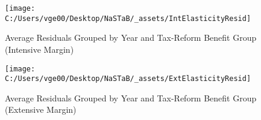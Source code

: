 \documentclass[ review  , 3p ]{elsarticle}
\begin{document}
  \begin{figure}
  
  {\centering \texttt{[image: C:/Users/vge00/Desktop/NaSTaB/\_assets/IntElasticityResid]} 
  
  }
  
  \caption{Average Residuals Grouped by Year and Tax-Reform Benefit Group (Intensive Margin)}\label{fig:unnamed-chunk-4}
  \end{figure}
  
  \begin{figure}
  
  {\centering \texttt{[image: C:/Users/vge00/Desktop/NaSTaB/\_assets/ExtElasticityResid]} 
  
  }
  
  \caption{Average Residuals Grouped by Year and Tax-Reform Benefit Group (Extensive Margin)}\label{fig:unnamed-chunk-5}
  \end{figure}
  
\end{document}
